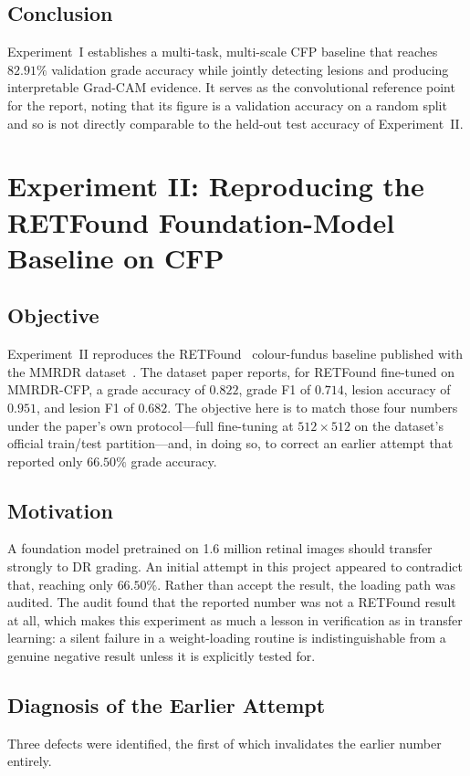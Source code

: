 \documentclass[journal,twoside,web]{ieeecolor}
\begin{document}
\subsection{Conclusion}
Experiment~I establishes a multi-task, multi-scale CFP baseline that reaches
$82.91\%$ validation grade accuracy while jointly detecting lesions and producing
interpretable Grad-CAM evidence. It serves as the convolutional reference point for
the report, noting that its figure is a validation accuracy on a random split and
so is not directly comparable to the held-out test accuracy of Experiment~II.

\section{Experiment II: Reproducing the RETFound Foundation-Model Baseline on CFP}
\label{sec:exp2}

\subsection{Objective}
Experiment~II reproduces the RETFound~\cite{retfound} colour-fundus baseline published
with the MMRDR dataset~\cite{mmrdr}. The dataset paper reports, for RETFound fine-tuned
on MMRDR-CFP, a grade accuracy of $0.822$, grade F1 of $0.714$, lesion accuracy of
$0.951$, and lesion F1 of $0.682$. The objective here is to match those four numbers
under the paper's own protocol---full fine-tuning at $512\times512$ on the dataset's
official train/test partition---and, in doing so, to correct an earlier attempt that
reported only $66.50\%$ grade accuracy.

\subsection{Motivation}
A foundation model pretrained on 1.6 million retinal images should transfer strongly to
DR grading. An initial attempt in this project appeared to contradict that, reaching only
$66.50\%$. Rather than accept the result, the loading path was audited. The audit found
that the reported number was not a RETFound result at all, which makes this experiment as
much a lesson in verification as in transfer learning: a silent failure in a
weight-loading routine is indistinguishable from a genuine negative result unless it is
explicitly tested for.

\subsection{Diagnosis of the Earlier Attempt}
Three defects were identified, the first of which invalidates the earlier number entirely.
\end{document}
